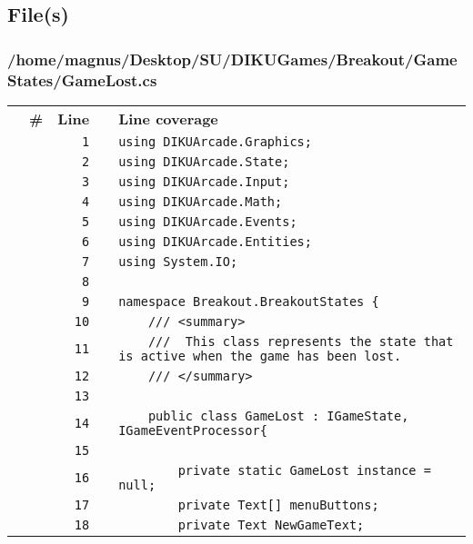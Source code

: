 \documentclass[a4paper,landscape,10pt]{article}
\begin{document}
\subsection{File(s)}
\subsubsection{/home/magnus/Desktop/SU/DIKUGames/Breakout/GameStates/GameLost.cs}
\begin{longtable}[l]{lrrll}
\textbf{} & \textbf{\#} & \textbf{Line} & \textbf{} & \textbf{Line coverage}\\
\cellcolor{gray} &  & \verb~1~ & & \verb~using DIKUArcade.Graphics;~\\
\cellcolor{gray} &  & \verb~2~ & & \verb~using DIKUArcade.State;~\\
\cellcolor{gray} &  & \verb~3~ & & \verb~using DIKUArcade.Input;~\\
\cellcolor{gray} &  & \verb~4~ & & \verb~using DIKUArcade.Math;~\\
\cellcolor{gray} &  & \verb~5~ & & \verb~using DIKUArcade.Events;~\\
\cellcolor{gray} &  & \verb~6~ & & \verb~using DIKUArcade.Entities;~\\
\cellcolor{gray} &  & \verb~7~ & & \verb~using System.IO;~\\
\cellcolor{gray} &  & \verb~8~ & & \verb~~\\
\cellcolor{gray} &  & \verb~9~ & & \verb~namespace Breakout.BreakoutStates {~\\
\cellcolor{gray} &  & \verb~10~ & & \verb~    /// <summary>~\\
\cellcolor{gray} &  & \verb~11~ & & \verb~    ///  This class represents the state that is active when the game has been lost.~\\
\cellcolor{gray} &  & \verb~12~ & & \verb~    /// </summary>~\\
\cellcolor{gray} &  & \verb~13~ & & \verb~~\\
\cellcolor{gray} &  & \verb~14~ & & \verb~    public class GameLost : IGameState, IGameEventProcessor{~\\
\cellcolor{gray} &  & \verb~15~ & & \verb~~\\
\cellcolor{gray} &  & \verb~16~ & & \verb~        private static GameLost instance = null;~\\
\cellcolor{gray} &  & \verb~17~ & & \verb~        private Text[] menuButtons;~\\
\cellcolor{gray} &  & \verb~18~ & & \verb~        private Text NewGameText;~\\

\end{longtable}
\end{document}
